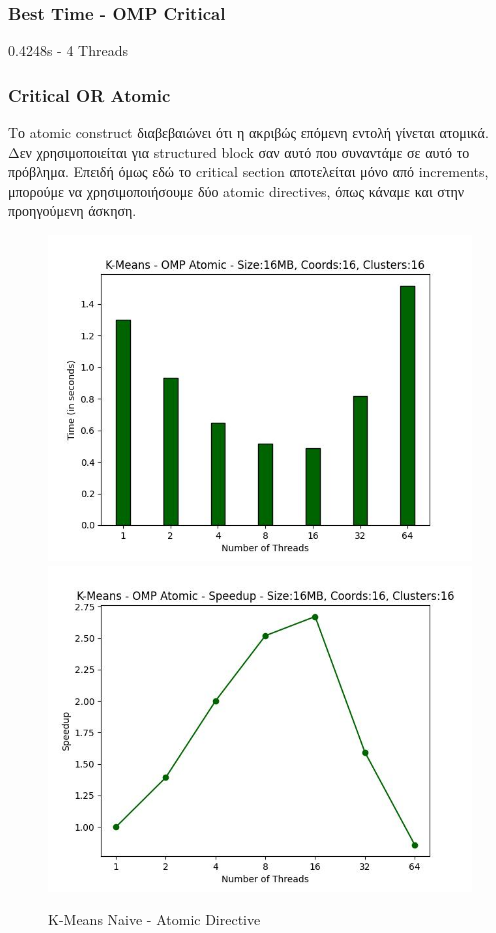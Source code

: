 \documentclass[../final_report.tex]{subfiles}
\begin{document}
\subsubsection*{Best Time - OMP Critical}
0.4248s - 4 Threads

\subsubsection*{Critical OR Atomic}

Το atomic construct διαβεβαιώνει ότι η ακριβώς επόμενη εντολή γίνεται ατομικά. Δεν χρησιμοποιείται για structured block σαν αυτό
που συναντάμε σε αυτό το πρόβλημα. Επειδή όμως εδώ το critical section αποτελείται μόνο από increments, μπορούμε να χρησιμοποιήσουμε 
δύο atomic directives, όπως κάναμε και στην προηγούμενη άσκηση.

\begin{figure}[H]
    \centering
        \includegraphics[scale=0.48]{outFilesAffinityMouliko/plots/kmeans_locks_atomic.jpg}
        \includegraphics[scale=0.48]{outFilesAffinityMouliko/plots/kmeans_locks_atomic_speedup.jpg}
    \caption{K-Means Naive - Atomic Directive}
    \label{fig:K-Means Naive - Atomic Directive}
\end{figure}
\end{document}
